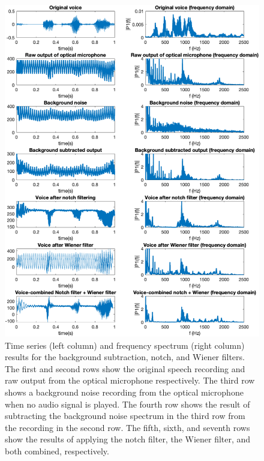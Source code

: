 \documentclass[paper-main.tex]{subfiles}
\begin{document}
\begin{figure}
	\begin{center}
	\includegraphics[height=0.85\textheight]{figures/notch_and_wiener_superplot_v2.pdf}
	\end{center}
	\caption{\label{fig:BackgroundNotchWienerCombined}
	Time series (left column) and frequency spectrum (right column) results for the background subtraction, notch, and Wiener filters.
	The first and second rows show the original speech recording and raw output from the optical microphone respectively. 
    The third row shows a background noise recording from the optical microphone when no audio signal is played. 
    The fourth row shows the result of subtracting the background noise spectrum in the third row from the recording in the second row. 
	The fifth, sixth, and seventh rows show the results of applying the notch filter, the Wiener filter, and both combined, respectively.
	}
\end{figure}
\end{document}
